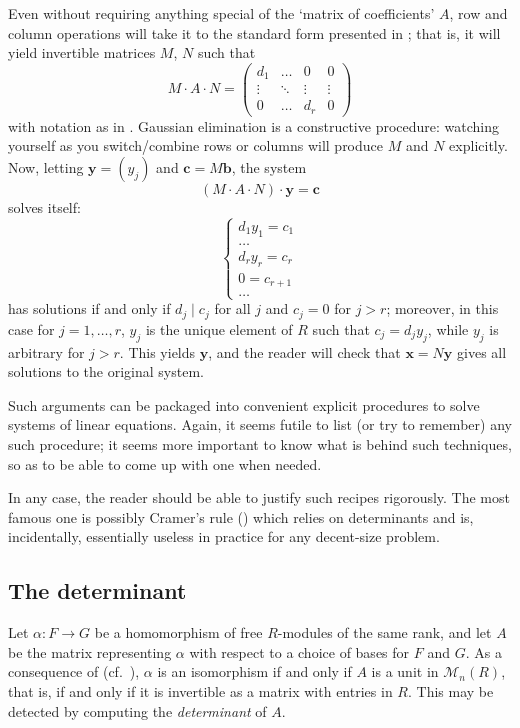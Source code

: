 Even without requiring anything special of the `matrix of
coefficients' $A$, row and column operations will take it to the
standard form presented in ; that is, it will yield
invertible matrices $M$, $N$ such that
\[
  M \cdot A \cdot N = \left(
    \begin{array}{ccc|c}
      d_1 & \dots & 0 & 0 \\
      \vdots & \ddots & \vdots & \vdots \\
      0 & \dots & d_r & 0
    \end{array}
  \right)
\]
with notation as in . Gaussian elimination is a
constructive procedure: watching yourself as you switch/combine rows
or columns will produce $M$ and $N$ explicitly. Now, letting
$\mathbf{y} = (y_j)$ and $\mathbf{c} = M\mathbf{b}$, the system
\[
  (M \cdot A \cdot N) \cdot \mathbf{y} = \mathbf{c}
\]
solves itself:
\[
  \begin{cases}
    d_1 y_1 = c_1 \\
    \dots \\
    d_r y_r = c_r \\
    0 = c_{r+1} \\
    \dots
  \end{cases}
\]
has solutions if and only if $d_j \mid c_j$ for all $j$ and $c_j = 0$
for $j > r$; moreover, in this case for
$j = 1, \dots, r$, $y_j$ is the unique element of $R$ such that
$c_j = d_j y_j$, while $y_j$ is arbitrary for $j > r$. This yields
$\mathbf{y}$, and the reader will check that
$\mathbf{x} = N\mathbf{y}$ gives all solutions to the original system.

Such arguments can be packaged into convenient explicit procedures to
solve systems of linear equations. Again, it seems futile to list (or
try to remember) any such procedure; it seems more important to know
what is behind such techniques, so as to be able to come up with one
when needed.

In any case, the reader should be able to justify such recipes
rigorously. The most famous one is possibly Cramer's rule
() which relies on determinants and is, incidentally,
essentially useless in practice for any decent-size problem.

\subsection{The determinant}
\label{subsec:linalg:the-determinant}
Let $\alpha : F \to G$ be a homomorphism of free $R$-modules of the
same rank, and let $A$ be the matrix representing $\alpha$ with
respect to a choice of bases for $F$ and $G$. As a consequence of
 (cf.\
), $\alpha$ is an
isomorphism if and only if $A$ is a unit in $\mathcal{M}_n(R)$, that
is, if and only if it is invertible as a matrix with entries in
$R$. This may be detected by computing the \emph{determinant} of $A$.

